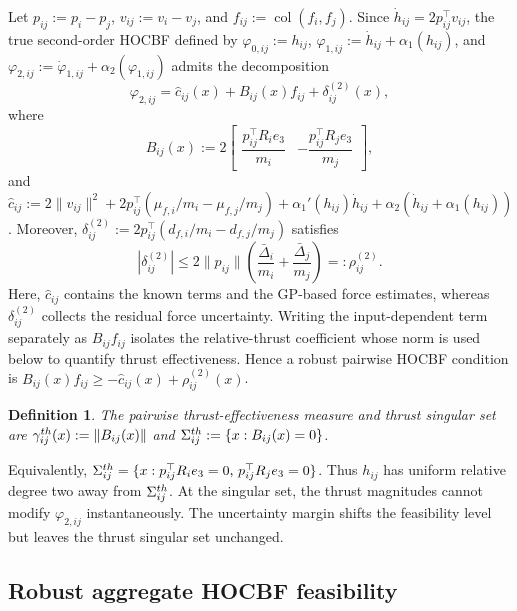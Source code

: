 \documentclass[10pt,a4paper]{amsart}
\newtheorem{definition}[theorem]{Definition}
\begin{document}
 Let $p_{ij}:=p_i-p_j$, $v_{ij}:=v_i-v_j$, and $f_{ij}:=\operatorname{col}(f_i,f_j)$. Since $\dot h_{ij}=2p_{ij}^\top v_{ij}$, the true second-order HOCBF defined by $\varphi_{0,ij}:=h_{ij}$, $\varphi_{1,ij}:=\dot h_{ij}+\alpha_1(h_{ij})$, and $\varphi_{2,ij}:=\dot\varphi_{1,ij}+\alpha_2(\varphi_{1,ij})$ admits the decomposition \begin{equation} \varphi_{2,ij} = \widehat c_{ij}(x) +B_{ij}(x)f_{ij} +\delta_{ij}^{(2)}(x), \label{eq:pairwise_hocbf_uncertain} \end{equation} where \begin{equation} B_{ij}(x) := 2\begin{bmatrix} \dfrac{p_{ij}^\top R_ie_3}{m_i} & -\dfrac{p_{ij}^\top R_je_3}{m_j} \end{bmatrix}, \label{eq:Bij} \end{equation} and $\widehat c_{ij} :=2\|v_{ij}\|^2 +2p_{ij}^\top(\mu_{f,i}/m_i-\mu_{f,j}/m_j) +\alpha_1'(h_{ij})\dot h_{ij} +\alpha_2(\dot h_{ij}+\alpha_1(h_{ij}))$. Moreover, $\delta_{ij}^{(2)} :=2p_{ij}^\top(d_{f,i}/m_i-d_{f,j}/m_j)$ satisfies \[ \left|\delta_{ij}^{(2)}\right|\leq 2\|p_{ij}\|
\left( \frac{\bar\Delta_i}{m_i} + \frac{\bar\Delta_j}{m_j}\right)=:\rho_{ij}^{(2)}.\] Here, $\widehat c_{ij}$ contains the known terms and the
GP-based force estimates, whereas $\delta_{ij}^{(2)}$ collects
the residual force uncertainty. Writing the input-dependent
term separately as $B_{ij}f_{ij}$ isolates the relative-thrust
coefficient whose norm is used below to quantify thrust
effectiveness. Hence a robust pairwise HOCBF condition is $B_{ij}(x)f_{ij}\ge-\widehat c_{ij}(x)+\rho_{ij}^{(2)}(x)$. 
 
 \begin{definition} The pairwise thrust-effectiveness measure and thrust singular set are $\gamma_{ij}^{\rm th}(x):=\|B_{ij}(x)\|$ and $\Sigma_{ij}^{\rm th}:=\{x:B_{ij}(x)=0\}$. \end{definition} 
 
 Equivalently,
$\Sigma_{ij}^{\rm th}
=\{x:p_{ij}^\top R_ie_3=0,\,
p_{ij}^\top R_je_3=0\}$.
Thus $h_{ij}$ has uniform relative degree two away from
$\Sigma_{ij}^{\rm th}$. At the singular set, the thrust
magnitudes cannot modify $\varphi_{2,ij}$ instantaneously.
The uncertainty margin shifts the feasibility level but leaves
the thrust singular set unchanged.
 
\subsection{Robust aggregate HOCBF feasibility}
\end{document}
